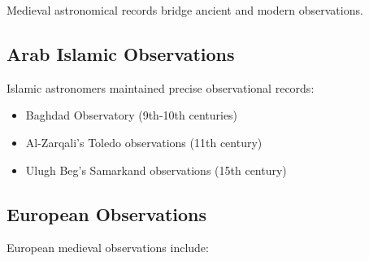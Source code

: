 \documentclass[12pt,a4paper]{report}
\begin{document}
Medieval astronomical records bridge ancient and modern observations.

\subsection{Arab Islamic Observations}

Islamic astronomers maintained precise observational records:

\begin{itemize}
\item Baghdad Observatory (9th-10th centuries)
\item Al-Zarqali's Toledo observations (11th century)
\item Ulugh Beg's Samarkand observations (15th century)
\end{itemize}

\subsection{European Observations}

European medieval observations include:
\end{document}
